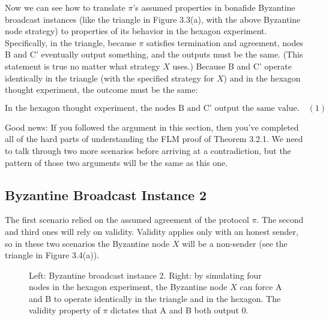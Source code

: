Now we can see how to translate $\pi$’s assumed properties in bonafide Byzantine broadcast instances (like the triangle in Figure 3.3(a), with the above Byzantine node strategy) to properties of its behavior in the hexagon experiment. Specifically, in the triangle, because
$\pi$ satisfies termination and agreement, nodes B and C' eventually output something, and
the outputs must be the same. (This statement is true no matter what strategy $X$ uses.)
Because B and C' operate identically in the triangle (with the specified strategy for $X$) and
in the hexagon thought experiment, the outcome must be the same:

$$\text{In the hexagon thought experiment, the nodes B and C' output the same value.} \quad (1)$$

Good news: If you followed the argument in this section, then you've completed all of the
hard parts of understanding the FLM proof of Theorem 3.2.1. We need to talk through two
more scenarios before arriving at a contradiction, but the pattern of those two arguments
will be the same as this one.

\subsection{Byzantine Broadcast Instance 2}
The first scenario relied on the assumed agreement of the protocol $\pi$. The second and third
ones will rely on validity. Validity applies only with an honest sender, so in these two
scenarios the Byzantine node $X$ will be a non-sender (see the triangle in Figure 3.4(a)).
\begin{figure}[h]
    \centering
    \qquad
    \caption{Left: Byzantine broadcast instance 2. Right: by simulating four nodes in the
    hexagon experiment, the Byzantine node $X$ can force A and B to operate identically in the
    triangle and in the hexagon. The validity property of $\pi$ dictates that A and B both output 0.}
    \label{fig:example}%
\end{figure}\\

